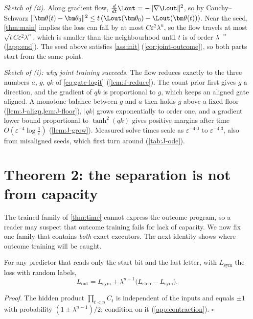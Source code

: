 \emph{Sketch of (ii).} Along gradient flow, $\frac{d}{dt}\Lout=-\|\nabla\Lout\|^2$, so by Cauchy--Schwarz
$\|\bm\theta(t)-\bm\theta_0\|^2\le t\,(\Lout(\bm\theta_0)-\Lout(\bm\theta(t)))$. Near the seed, \cref{thm:main} implies the loss can fall
by at most $C\varepsilon^2\lambda^n$, so the flow travels at most $\sqrt{t\,C\varepsilon^2\lambda^n}$, which is smaller than the
neighbourhood until $t$ is of order $\lambda^{-n}$ (\cref{app:end}). The seed above satisfies \cref{ass:init}
(\cref{cor:joint-outcome}), so both parts start from the same point.

\emph{Sketch of (i): why joint training succeeds.} The flow reduces exactly to the three numbers $a$, $g$, $qk$ of
\cref{eq:gate-logit} (\cref{lem:J-reduce}). The count prior first gives $g$ a direction, and the gradient of $qk$ is proportional to
$g$, which keeps an aligned gate aligned. A monotone balance between $g$ and $a$ then holds
$g$ above a fixed floor (\cref{lem:J-align,lem:J-floor}), $|qk|$ grows exponentially to order one, and a gradient lower bound
proportional to $\tanh^2(qk)$ gives positive margins after time $O(\varepsilon^{-4}\log\frac1\varepsilon)$ (\cref{lem:J-grow}). Measured solve
times scale as $\varepsilon^{-4.0}$ to $\varepsilon^{-4.3}$, also from misaligned seeds, which first turn around (\cref{tab:J-ode}).

\section{Theorem 2: the separation is not from capacity}
\label{sec:matched}
\label{sec:two-path-trap}

The trained family of \cref{thm:time} cannot express the outcome program, so a reader may suspect that outcome training
fails for lack of capacity. We now fix one family that contains \emph{both} exact executors. The next identity shows where
outcome training will be caught.

\begin{lemma}
\label{lem:binary-loss-mixture}
For any predictor that reads only the start bit and the last letter, with $L_{\mathrm{sym}}$ the loss with random labels,
\begin{equation}
 L_{\mathrm{out}}=L_{\mathrm{sym}}+\lambda^{n-1}\bigl(L_{\mathrm{step}}-L_{\mathrm{sym}}\bigr).
 \label{eq:binary-loss-mixture}
\end{equation}
\end{lemma}
\emph{Proof.} The hidden product $\prod_{t<n}C_t$ is independent of the inputs and equals $\pm1$ with probability
$(1\pm\lambda^{n-1})/2$; condition on it (\cref{app:contraction}). \hfill$\square$

